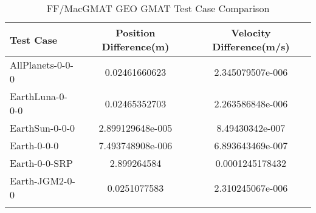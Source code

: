 \begin{table}[htbp!]
\centering
\caption{ FF/MacGMAT GEO GMAT Test Case Comparison}
      \begin{tabular}{lcc}
      \hline\hline
          Test Case & Position Difference(m) & Velocity Difference(m/s) \\
         \hline
         AllPlanets-0-0-0 & 0.02461660623 & 2.345079507e-006 \\
         EarthLuna-0-0-0 & 0.02465352703 & 2.263586848e-006 \\
         EarthSun-0-0-0 & 2.899129648e-005 & 8.49430342e-007 \\
         Earth-0-0-0 & 7.493748908e-006 & 6.893643469e-007 \\
         Earth-0-0-SRP & 2.899264584 & 0.0001245178432 \\
         Earth-JGM2-0-0 & 0.0251077583 & 2.310245067e-006 \\
      \hline\hline
      \label{Table: GEO GMAT Table} 
\end{tabular}
\end{table}
